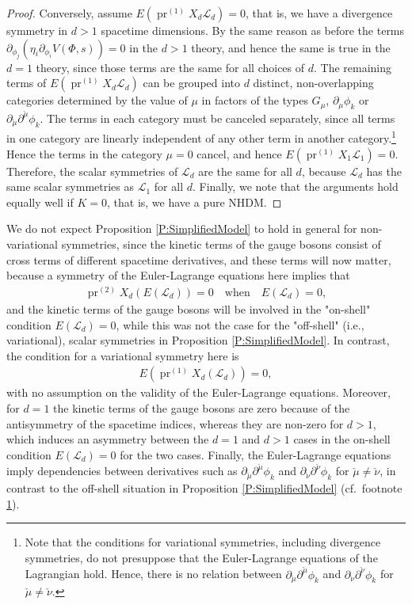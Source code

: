 \documentclass[a4paper,hidelinks, 12pt]{article}
\numberwithin{equation}{section}
\theoremstyle{plain}
\newcommand{\mc}{\mathcal}
\newcommand{\on}{\operatorname}
\begin{document}
\begin{proof}
Conversely, assume $E(\on{pr}^{(1)}X_d\mc{L}_d)=0$, that is, we have a divergence symmetry in $d>1$ spacetime dimensions. By the same reason as before the terms 
$\partial_{\phi_j}(\eta_i \partial_{\phi_i} V(\Phi,s))=0$ in the $d>1$ theory, and hence the same is true in the $d=1$ theory, since those terms are the same for all choices of $d$. The remaining terms of $E(\on{pr}^{(1)}X_d\mc{L}_d)$
can be grouped into $d$ distinct, non-overlapping categories   
determined by the value of $\mu$ in factors of the types $G_\mu$,
$\partial_\mu \phi_k$ or $\partial_{\check{\mu}} \partial^{\check{\mu}} \phi_k$. 
The terms in each category must be canceled separately, since 
all terms in one category are linearly independent of any other term in another category.\footnote{\label{fnote:offShell} Note that the conditions for variational symmetries, including divergence symmetries, do not presuppose that the Euler-Lagrange equations of the Lagrangian hold. Hence, there is no relation between
$\partial_{\check{\mu}} \partial^{\check{\mu}} \phi_k$ and $\partial_{\check{\nu}} \partial^{\check{\nu}} \phi_k$ for $\check{\mu}\ne \check{\nu}$.} Hence the terms in the category $\mu=0$ cancel, and hence $E(\on{pr}^{(1)}X_1\mc{L}_1)=0$. Therefore, the scalar symmetries of $\mc{L}_d$ are the same for all $d$, because $\mc{L}_d$ has the same scalar symmetries as $\mc{L}_1$ for all $d$. Finally, we note that the arguments hold equally well if $K=0$, that is, we have a pure NHDM.
\end{proof}
We do not expect Proposition \ref{P:SimplifiedModel} to 
hold in general for non-variational symmetries, since the kinetic terms of the gauge bosons
consist of cross terms of different spacetime derivatives, and these terms will now matter, because a symmetry of the Euler-Lagrange equations
here implies that 
\begin{align}
	\on{pr}^{(2)}X_d (E(\mc{L}_d))=0 \quad \text{when}\quad E(\mc{L}_d)=0, 
\end{align}
and the kinetic terms of the gauge bosons will be involved in the "on-shell" condition $E(\mc{L}_d)=0$, while this was not the case for the "off-shell" (i.e., variational), scalar symmetries in Proposition \ref{P:SimplifiedModel}.
In contrast, the condition for a variational symmetry here is
\begin{align}
	E(\on{pr}^{(1)}X_d(\mc{L}_d))=0,
\end{align}
 with no assumption on the validity of the Euler-Lagrange equations.
Moreover, for $d=1$ the kinetic terms of the gauge bosons are zero because of the antisymmetry of the spacetime indices, whereas they are non-zero for $d>1$, which induces an asymmetry between the $d=1$ and $d>1$ cases in the on-shell condition $E(\mc{L}_d)=0$ for the two cases. Finally, the Euler-Lagrange equations imply dependencies between derivatives such as $\partial_{\check{\mu}} \partial^{\check{\mu}} \phi_k$ and $\partial_{\check{\nu}} \partial^{\check{\nu}} \phi_k$ for $\check{\mu}\ne \check{\nu}$, in contrast to the off-shell situation in Proposition \ref{P:SimplifiedModel} (cf.~footnote \ref{fnote:offShell}).
\end{document}
